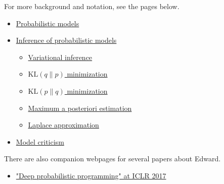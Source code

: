 For more background and notation, see the pages below.
\begin{itemize}
  \item \href{model}{Probabilistic models}
  \item \href{inference}{Inference of probabilistic models}
  \begin{itemize}
   \item \href{variational-inference}{Variational inference}
   \item \href{klqp}{$\text{KL}(q\|p)$ minimization}
   \item \href{klpq}{$\text{KL}(p\|q)$ minimization}
   \item \href{map}{Maximum a posteriori estimation}
   \item \href{map-laplace}{Laplace approximation}
  \end{itemize}
  \item \href{criticism}{Model criticism}
\end{itemize}

There are also companion webpages for several papers about Edward.
\begin{itemize}
\item
\href{/iclr2017}{"Deep probabilistic programming" at ICLR 2017}
\end{itemize}

